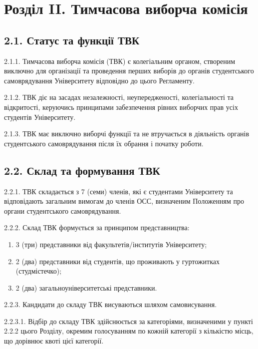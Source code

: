 \section*{Розділ II. Тимчасова виборча комісія}

\subsection*{2.1. Статус та функції ТВК}
    2.1.1. Тимчасова виборча комісія (ТВК) є колегіальним органом, створеним виключно для організації та проведення перших виборів до органів студентського самоврядування Університету відповідно до цього Регламенту.

    2.1.2. ТВК діє на засадах незалежності, неупередженості, колегіальності та відкритості, керуючись принципами забезпечення рівних виборчих прав усіх студентів Університету.

    2.1.3. ТВК має виключно виборчі функції та не втручається в діяльність органів студентського самоврядування після їх обрання і початку роботи.

\subsection*{2.2. Склад та формування ТВК}
    2.2.1. ТВК складається з 7 (семи) членів, які є студентами Університету та відповідають загальним вимогам до членів ОСС, визначеним Положенням про органи студентського самоврядування.

    2.2.2. Склад ТВК формується за принципом представництва:

        \begin{enumerate}[label=\alph*)]
            \item 3 (три) представники від факультетів/інститутів Університету;
            \item 2 (два) представники від студентів, що проживають у гуртожитках (студмістечко);
            \item 2 (два) загальноуніверситетські представники.
        \end{enumerate}

    2.2.3. Кандидати до складу ТВК висуваються шляхом самовисування.

    2.2.3.1. Відбір до складу ТВК здійснюється за категоріями, визначеними у пункті 2.2.2 цього Розділу, окремим голосуванням по кожній категорії з кількістю місць, що дорівнює квоті цієї категорії.

